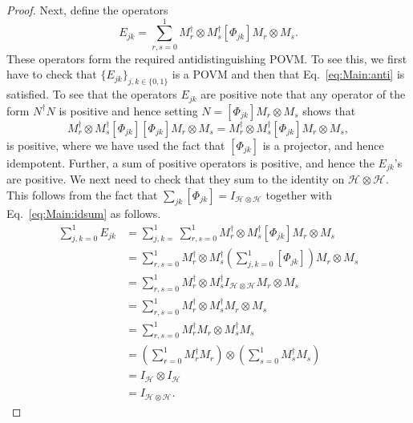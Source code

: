 \documentclass[DIV=calc,fontsize=12pt]{scrartcl} %
\theoremstyle{definition}
\theoremstyle{plain}
\newcommand{\Proj}[1]{\ensuremath{\left [ #1 \right ]}}
\newcommand{\Hilb}[1][]{\ensuremath{\mathcal{H}_{#1}}}
\begin{document}
\begin{proof}
Next, define the operators
\begin{equation}
E_{jk} = \sum_{r,s = 0}^1 M_r^{\dagger} \otimes M_s^{\dagger}
\Proj{\Phi_{jk}} M_r \otimes M_s.
\end{equation}
These operators form the required antidistinguishing POVM\@.  To see
this, we first have to check that $\{E_{jk}\}_{j,k \in \{0,1\}}$ is
a POVM and then that Eq.~\eqref{eq:Main:anti} is satisfied.  To see
that the operators $E_{jk}$ are positive note that any operator of
the form $N^{\dagger}N$ is positive and hence setting $N =
\Proj{\Phi_{jk}} M_r \otimes M_s$ shows that
\begin{equation}
M_r^{\dagger} \otimes M_s^{\dagger} \Proj{\Phi_{jk}} \Proj{\Phi_{jk}}
M_r \otimes M_s = M_r^{\dagger} \otimes M_s^{\dagger}
\Proj{\Phi_{jk}} M_r \otimes M_s,
\end{equation}
is positive, where we have used the fact that $\Proj{\Phi_{jk}}$ is
a projector, and hence idempotent.  Further, a sum of positive
operators is positive, and hence the $E_{jk}$'s are positive.  We
next need to check that they sum to the identity on $\Hilb \otimes
\Hilb$.  This follows from the fact that $\sum_{jk} \Proj{\Phi_{jk}}
= I_{\Hilb \otimes \Hilb}$ together with Eq.~\eqref{eq:Main:idsum}
as follows.
\begin{align}
\sum_{j,k = 0}^1 E_{jk} & = \sum_{j,k=}^1 \sum_{r,s = 0}^1
M_r^{\dagger} \otimes
M_s^{\dagger} \Proj{\Phi_{jk}} M_r \otimes M_s \\
& = \sum_{r,s = 0}^1 M_r^{\dagger} \otimes M_s^{\dagger} \left (
\sum_{j,k=0}^1\Proj{\Phi_{jk}}\right ) M_r
\otimes M_s \\
& = \sum_{r,s = 0}^1 M_r^{\dagger} \otimes M_s^{\dagger} I_{\Hilb
\otimes \Hilb} M_r \otimes M_s \\
& = \sum_{r,s = 0}^1 M_r^{\dagger} \otimes M_s^{\dagger} M_r
\otimes M_s \\
& = \sum_{r,s = 0}^1 M_r^{\dagger}M_r \otimes M_s^{\dagger} M_s \\
& = \left ( \sum_{r=0}^1 M_r^{\dagger}M_r \right ) \otimes \left
( \sum_{s=0}^1 M_s^{\dagger}M_s \right ) \\
& = I_{\Hilb} \otimes I_{\Hilb} \\
& = I_{\Hilb \otimes \Hilb}.
\end{align}


\end{proof}
\end{document}

